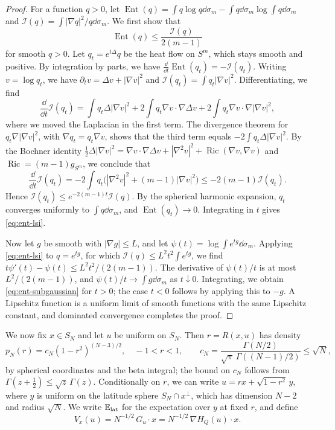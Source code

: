 \begin{proof}
For a function $q>0$, let $\operatorname{Ent}(q)=\int q\log q\dd\sigma_m
-\int q\dd\sigma_m\log\int q\dd\sigma_m$ and
$\mathcal I(q)=\int|\nabla q|^2/q\dd\sigma_m$. We first show that
\begin{equation}\label{eq:ent-lsi}
 \operatorname{Ent}(q)\le\frac{\mathcal I(q)}{2(m-1)}
\end{equation}
for smooth $q>0$. Let $q_t=e^{t\Delta}q$ be the heat flow on $S^m$, which
stays smooth and positive. By integration by parts,
we have $\frac{\dd}{\dd t}\operatorname{Ent}(q_t)=-\mathcal I(q_t)$. Writing
$v=\log q_t$, we have $\partial_tv=\Delta v+|\nabla v|^2$ and
$\mathcal I(q_t)=\int q_t|\nabla v|^2$. Differentiating, we find
\[
 \frac{\dd}{\dd t}\mathcal I(q_t)
 =\int q_t\Delta|\nabla v|^2+2\int q_t\nabla v\cdot\nabla\Delta v
  +2\int q_t\nabla v\cdot\nabla|\nabla v|^2 ,
\]
where we moved the Laplacian in the first term. The divergence theorem for
$q_t\nabla|\nabla v|^2$, with $\nabla q_t=q_t\nabla v$, shows that the third
term equals $-2\int q_t\Delta|\nabla v|^2$. By the Bochner identity
$\frac12\Delta|\nabla v|^2=\nabla v\cdot\nabla\Delta v+|\nabla^2v|^2
+\operatorname{Ric}(\nabla v,\nabla v)$ and $\operatorname{Ric}=(m-1)g_{S^m}$,
we conclude that
\[
 \frac{\dd}{\dd t}\mathcal I(q_t)
 =-2\int q_t\bigl(|\nabla^2v|^2+(m-1)|\nabla v|^2\bigr)
 \le-2(m-1)\mathcal I(q_t).
\]
Hence $\mathcal I(q_t)\le e^{-2(m-1)t}\mathcal I(q)$. By the spherical harmonic
expansion, $q_t$ converges uniformly to $\int q\dd\sigma_m$, and
$\operatorname{Ent}(q_t)\to0$. Integrating in $t$ gives
\eqref{eq:ent-lsi}.

Now let $g$ be smooth with $|\nabla g|\le L$, and let
$\psi(t)=\log\int e^{tg}\dd\sigma_m$. Applying \eqref{eq:ent-lsi} to
$q=e^{tg}$, for which $\mathcal I(q)\le L^2t^2\int e^{tg}$, we find
$t\psi'(t)-\psi(t)\le L^2t^2/(2(m-1))$. The derivative of $\psi(t)/t$ is
at most $L^2/(2(m-1))$, and $\psi(t)/t\to\int g\dd\sigma_m$ as
$t\downarrow0$. Integrating, we obtain \eqref{eq:ent-subgaussian} for $t>0$;
the case $t<0$ follows by applying this to $-g$. A Lipschitz function is a uniform
limit of smooth functions with the same Lipschitz constant, and dominated
convergence completes the proof.
\end{proof}

We now fix $x\in S_N$ and let $u$ be uniform on $S_N$. Then $r=R(x,u)$ has
density
\begin{equation}\label{eq:ent-axis-density}
 p_N(r)=c_N(1-r^2)^{(N-3)/2},\quad -1<r<1,\qquad
 c_N=\frac{\Gamma(N/2)}{\sqrt\pi\,\Gamma((N-1)/2)}\le\sqrt N,
\end{equation}
by spherical coordinates and the beta integral; the bound on $c_N$ follows
from $\Gamma(z+\frac12)\le\sqrt z\,\Gamma(z)$. Conditionally on $r$, we can
write $u=rx+\sqrt{1-r^2}\,y$, where $y$ is uniform on the latitude sphere
$S_N\cap x^\perp$, which has dimension $N-2$ and radius $\sqrt N$. We write
$\mathbb E_{\rm lat}$ for the expectation over $y$ at fixed $r$, and define
\begin{equation}\label{eq:ent-V}
 V_x(u)=N^{-1/2}\,G_u\cdot x=N^{-1/2}\,\nabla H_Q(u)\cdot x .
\end{equation}

